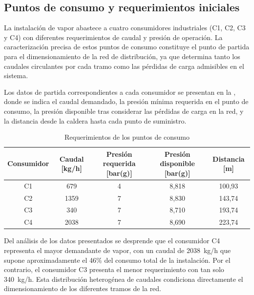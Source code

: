 \documentclass[12pt]{article}
\begin{document}
\subsection{Puntos de consumo y requerimientos iniciales}
\label{subsec:puntos-consumo-requerimientos}

La instalación de vapor abastece a cuatro consumidores industriales (C1, C2, C3 y C4) con diferentes requerimientos de caudal y presión de operación. La caracterización precisa de estos puntos de consumo constituye el punto de partida para el dimensionamiento de la red de distribución, ya que determina tanto los caudales circulantes por cada tramo como las pérdidas de carga admisibles en el sistema.

Los datos de partida correspondientes a cada consumidor se presentan en la , donde se indica el caudal demandado, la presión mínima requerida en el punto de consumo, la presión disponible tras considerar las pérdidas de carga en la red, y la distancia desde la caldera hasta cada punto de suministro.

\begin{table}[H]
	\centering
	\caption{Requerimientos de los puntos de consumo}
	\label{tab:consumidores-requerimientos}
	\begin{tabular}{ccccc}
		\toprule
		\textbf{Consumidor} & \textbf{Caudal [kg/h]} & \textbf{Presión requerida [bar(g)]} & \textbf{Presión disponible [bar(g)]} & \textbf{Distancia [m]} \\
		\midrule
		C1                  & 679                    & 4                                   & 8,818                                & 100,93                 \\
		C2                  & 1359                   & 7                                   & 8,830                                & 143,74                 \\
		C3                  & 340                    & 7                                   & 8,710                                & 193,74                 \\
		C4                  & 2038                   & 7                                   & 8,690                                & 223,74                 \\
		\bottomrule
	\end{tabular}
\end{table}

Del análisis de los datos presentados se desprende que el consumidor C4 representa el mayor demandante de vapor, con un caudal de 2038~kg/h que supone aproximadamente el 46\% del consumo total de la instalación. Por el contrario, el consumidor C3 presenta el menor requerimiento con tan solo 340~kg/h. Esta distribución heterogénea de caudales condiciona directamente el dimensionamiento de los diferentes tramos de la red.
\end{document}
